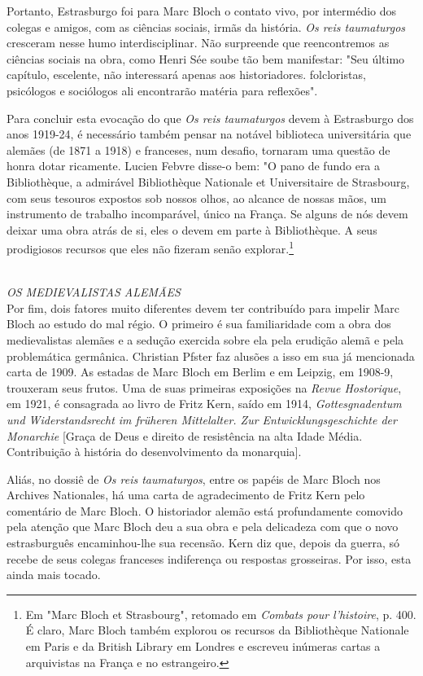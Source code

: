 \documentclass[a5paper]{book}
\begin{document}
Portanto, Estrasburgo foi para Marc Bloch o contato vivo, por intermédio dos colegas e amigos, com as ciências sociais, irmãs da história. \textit{Os reis taumaturgos} cresceram nesse humo interdisciplinar. Não surpreende que reencontremos as ciências sociais na obra, como Henri Sée soube tão bem manifestar: "Seu último capítulo, escelente, não interessará apenas aos historiadores. folcloristas, psicólogos e sociólogos ali encontrarão matéria para reflexões".

Para concluir esta evocação do que \textit{Os reis taumaturgos} devem à Estrasburgo dos anos 1919-24, é necessário também pensar na notável biblioteca universitária que alemães (de 1871 a 1918) e franceses, num desafio, tornaram uma questão de honra dotar ricamente. Lucien Febvre disse-o bem: "O pano de fundo era a Bibliothèque, a admirável Bibliothèque Nationale et Universitaire de Strasbourg, com seus tesouros expostos sob nossos olhos, ao alcance de nossas mãos, um instrumento de trabalho incomparável, único na França. Se alguns de nós devem deixar uma obra atrás de si, eles o devem em parte à Bibliothèque. A seus prodigiosos recursos que eles não fizeram senão explorar.\footnote{Em "Marc Bloch et Strasbourg", retomado em \textit{Combats pour l'histoire}, p. 400. É claro, Marc Bloch também explorou os recursos da Bibliothèque Nationale em Paris e da British Library em Londres e escreveu inúmeras cartas a arquivistas na França e no estrangeiro.}

~\\ \large \textit{OS MEDIEVALISTAS ALEMÃES} ~\\

Por fim, dois fatores muito diferentes devem ter contribuído para impelir Marc Bloch ao estudo do mal régio. O primeiro é sua familiaridade com a obra dos medievalistas alemães e a sedução exercida sobre ela pela erudição alemã e pela problemática germânica. Christian Pfster faz alusões a isso em sua já mencionada carta de 1909. As estadas de Marc Bloch em Berlim e em Leipzig, em 1908-9, trouxeram seus frutos. Uma de suas primeiras exposições na \textit{Revue Hostorique}, em 1921, é consagrada ao livro de Fritz Kern, saído em 1914, \textit{Gottesgnadentum und Widerstandsrecht im früheren Mittelalter. Zur Entwicklungsgeschichte der Monarchie} [Graça de Deus e direito de resistência na alta Idade Média. Contribuição à história do desenvolvimento da monarquia].

Aliás, no dossiê de \textit{Os reis taumaturgos}, entre os papéis de Marc Bloch nos Archives Nationales, há uma carta de agradecimento de Fritz Kern pelo comentário de Marc Bloch. O historiador alemão está profundamente comovido pela atenção que Marc Bloch deu a sua obra e pela delicadeza com que o novo estrasburguês encaminhou-lhe sua recensão. Kern diz que, depois da guerra, só recebe de seus colegas franceses indiferença ou respostas grosseiras. Por isso, esta ainda mais tocado.
\end{document}
